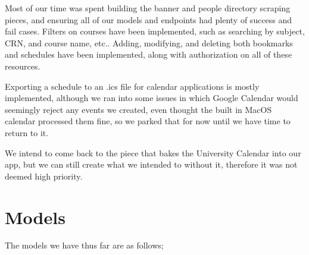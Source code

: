 \documentclass[12pt]{article}
\begin{document}
    Most of our time was spent building the banner and people directory scraping pieces, and ensuring all of our models and endpoints had plenty of success and fail cases. Filters on courses have been implemented, such as searching by subject, CRN, and course name, etc.. Adding, modifying, and deleting both bookmarks and schedules have been implemented, along with authorization on all of these resources.
    
    Exporting a schedule to an .ics file for calendar applications is mostly implemented, although we ran into some issues in which Google Calendar would seemingly reject any events we created, even thought the built in MacOS calendar processed them fine, so we parked that for now until we have time to return to it.
    
    We intend to come back to the piece that bakes the University Calendar into our app, but we can still create what we intended to without it, therefore it was not deemed high priority.

\section{Models}

    The models we have thus far are as follows;
    
\end{document}

